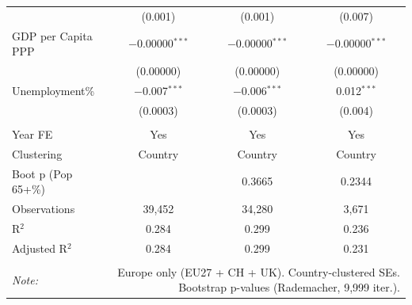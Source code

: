 \begin{table}[!htbp]
\begin{tabular}{@{\extracolsep{5pt}}lccc}
  & (0.001) & (0.001) & (0.007) \\ 
  GDP per Capita PPP & $-$0.00000$^{***}$ & $-$0.00000$^{***}$ & $-$0.00000$^{***}$ \\ 
  & (0.00000) & (0.00000) & (0.00000) \\ 
  Unemployment\% & $-$0.007$^{***}$ & $-$0.006$^{***}$ & 0.012$^{***}$ \\ 
  & (0.0003) & (0.0003) & (0.004) \\ 
 \hline \\[-1.8ex] 
Year FE & Yes & Yes & Yes \\ 
Clustering & Country & Country & Country \\ 
Boot p (Pop 65+\%) &  & 0.3665 & 0.2344 \\ 
Observations & 39,452 & 34,280 & 3,671 \\ 
R$^{2}$ & 0.284 & 0.299 & 0.236 \\ 
Adjusted R$^{2}$ & 0.284 & 0.299 & 0.231 \\ 
\hline 
\hline \\[-1.8ex] 
\textit{Note:}  & \multicolumn{3}{r}{Europe only (EU27 + CH + UK). Country-clustered SEs. Bootstrap p-values (Rademacher, 9,999 iter.).} \\ 
\end{tabular} 
\end{table} 
